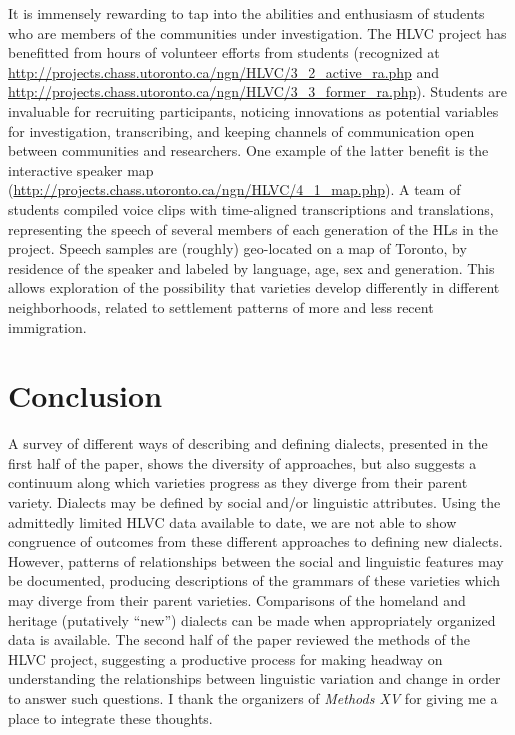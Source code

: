 \documentclass[output=paper]{LSP/langsci}
\begin{document}
It is immensely rewarding to tap into the abilities and enthusiasm of students who are members of the communities under investigation. The HLVC project has benefitted from hours of volunteer efforts from students (recognized at \url{http://projects.chass.utoronto.ca/ngn/HLVC/3_2_active_ra.php} and \url{http://projects.chass.utoronto.ca/ngn/HLVC/3_3_former_ra.php}). Students are invaluable for recruiting participants, noticing innovations as potential variables for investigation, transcribing, and keeping channels of communication open between communities and researchers. One example of the latter benefit is the interactive speaker map (\url{http://projects.chass.utoronto.ca/ngn/HLVC/4_1_map.php}). A team of students compiled voice clips with time-aligned transcriptions and translations, representing the speech of several members of each generation of the HLs in the project. Speech samples are (roughly) geo-located on a map of Toronto, by residence of the speaker and labeled by language, age, sex and generation. This allows exploration of the possibility that varieties develop differently in different neighborhoods, related to settlement patterns of more and less recent immigration. 

\section{Conclusion}
A survey of different ways of describing and defining dialects, presented in the first half of the paper, shows the diversity of approaches, but also suggests a continuum along which varieties progress as they diverge from their parent variety. Dialects may be defined by social and/or linguistic attributes. Using the admittedly limited HLVC data available to date, we are not able to show congruence of outcomes from these different approaches to defining new dialects. However, patterns of relationships between the social and linguistic features may be documented, producing descriptions of the grammars of these varieties which may diverge from their parent varieties. Comparisons of the homeland and heritage (putatively “new”) dialects can be made when appropriately organized data is available. The second half of the paper reviewed the methods of the HLVC project, suggesting a productive process for making headway on understanding the relationships between linguistic variation and change in order to answer such questions. I thank the organizers of \textit{Methods XV} for giving me a place to integrate these thoughts. 

\printbibliography[heading=subbibliography,notkeyword=this]
\end{document}
